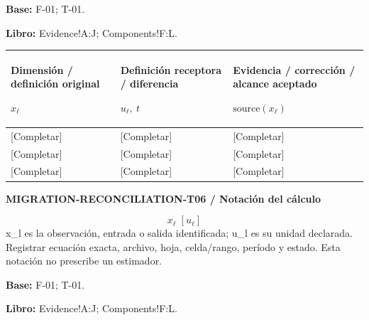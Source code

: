 \textbf{Base:} F-01; T-01.\par
\textbf{Libro:} Evidence!A:J; Components!F:L.\par\endgroup
{\sffamily\fontsize{8.3}{10.3}\selectfont\begin{longtable}{@{}P{54.83mm} P{54.83mm} P{54.83mm}@{}}
\toprule
\textbf{Dimensión / definición original}\par {\normalfont\fontsize{8.2}{10}\selectfont $x_{\ell}$} & \textbf{Definición receptora / diferencia}\par {\normalfont\fontsize{8.2}{10}\selectfont $u_{\ell},\ t$} & \textbf{Evidencia / corrección / alcance aceptado}\par {\normalfont\fontsize{8.2}{10}\selectfont $\text{source}(x_{\ell})$}\\\midrule\endhead
\rule{0pt}{8mm}[Completar] & [Completar] & [Completar]\\\hline
\rule{0pt}{8mm}[Completar] & [Completar] & [Completar]\\\hline
\rule{0pt}{8mm}[Completar] & [Completar] & [Completar]\\\hline
\end{longtable}}
\par\begingroup\sffamily\fontsize{8}{10}\selectfont\color{NEBGreen}\setlength{\parskip}{2pt}\setlength{\abovedisplayskip}{4pt}\setlength{\belowdisplayskip}{4pt}\setlength{\abovedisplayshortskip}{2pt}\setlength{\belowdisplayshortskip}{3pt}
\textbf{MIGRATION-RECONCILIATION-T06 / Notación del cálculo}\par
{\fontsize{9}{11}\selectfont\[ x_{\ell}\;[u_{\ell}] \]}
x\_l es la observación, entrada o salida identificada; u\_l es su unidad declarada. Registrar ecuación exacta, archivo, hoja, celda/rango, período y estado. Esta notación no prescribe un estimador.\par
\textbf{Base:} F-01; T-01.\par
\textbf{Libro:} Evidence!A:J; Components!F:L.\par\endgroup
